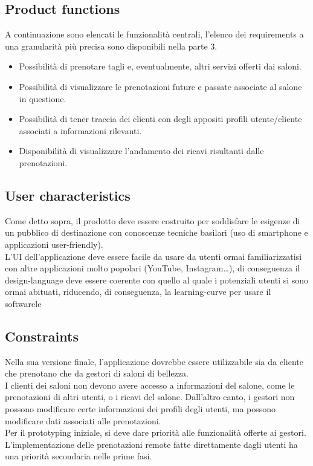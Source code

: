 \documentclass{article}
\begin{document}
\subsection {Product functions} 
A continuazione sono elencati le funzionalità centrali, l’elenco dei requirements a una granularità più precisa sono disponibili nella parte 3.
\begin{itemize}
    \item Possibilità di prenotare tagli e, eventualmente, altri servizi offerti dai saloni.
    \item Possibilità di visualizzare le prenotazioni future e passate associate al salone in questione.
    \item Possibilità di tener traccia dei clienti con degli appositi profili utente/cliente associati a informazioni rilevanti.
    \item Disponibilità di visualizzare l’andamento dei ricavi risultanti dalle prenotazioni. 
\end{itemize}
\subsection {User characteristics} 
Come detto sopra, il prodotto deve essere costruito per soddisfare le esigenze di un pubblico di destinazione con conoscenze tecniche basilari (uso di smartphone e applicazioni user-friendly). 
\\L’UI dell’applicazione deve essere facile da usare da utenti ormai familiarizzatisi con altre applicazioni molto popolari (YouTube, Instagram…), di conseguenza il design-language deve essere coerente con quello al quale i potenziali utenti si sono ormai abituati, riducendo, di conseguenza, la learning-curve per usare il softwarele
\subsection {Constraints} 
Nella sua versione finale, l’applicazione dovrebbe essere utilizzabile sia da cliente che prenotano che da gestori di saloni di bellezza. 
\\I clienti dei saloni non devono avere accesso a informazioni del salone, come le prenotazioni di altri utenti, o i ricavi del salone. Dall’altro canto, i gestori non possono modificare certe informazioni dei profili degli utenti, ma possono modificare dati associati alle prenotazioni. 
\\Per il prototyping iniziale, si deve dare priorità alle funzionalità offerte ai gestori. L’implementazione delle prenotazioni remote fatte direttamente dagli utenti ha una priorità secondaria nelle prime fasi.
\end{document}
